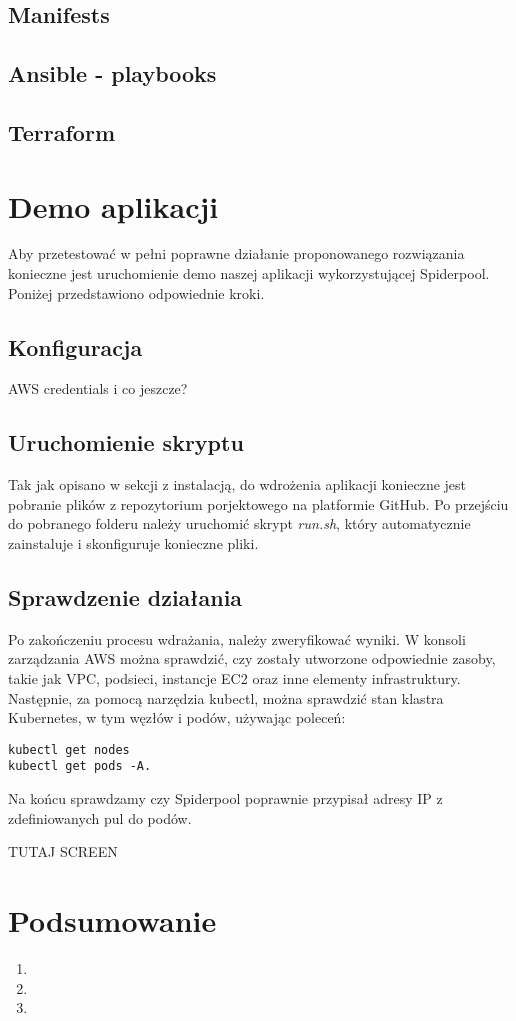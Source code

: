\documentclass[onecolumn,12pt]{article}
\begin{document}
\subsection{Manifests}

\subsection{Ansible - playbooks}

\subsection{Terraform}

\section{Demo aplikacji}
Aby przetestować w pełni poprawne działanie proponowanego rozwiązania konieczne jest uruchomienie
demo naszej aplikacji wykorzystującej Spiderpool. Poniżej przedstawiono odpowiednie kroki.

\subsection{Konfiguracja}

AWS credentials i co jeszcze?

\subsection{Uruchomienie skryptu}

Tak jak opisano w sekcji z instalacją, do wdrożenia aplikacji konieczne jest pobranie plików z 
repozytorium porjektowego na platformie GitHub. Po przejściu do pobranego folderu należy 
uruchomić skrypt \textit{run.sh}, który automatycznie zainstaluje i skonfiguruje konieczne pliki.

\subsection{Sprawdzenie działania}
Po zakończeniu procesu wdrażania, należy zweryfikować wyniki. W konsoli zarządzania AWS można
sprawdzić, czy zostały utworzone odpowiednie zasoby, takie jak VPC, podsieci, instancje EC2 oraz
inne elementy infrastruktury. Następnie, za pomocą narzędzia kubectl, można sprawdzić stan klastra
Kubernetes, w tym węzłów i podów, używając poleceń:

\begin{verbatim}
kubectl get nodes
kubectl get pods -A.
\end{verbatim}

Na końcu sprawdzamy czy Spiderpool poprawnie przypisał adresy IP z zdefiniowanych pul do podów.


TUTAJ SCREEN

\section{Podsumowanie}

\begin{enumerate}
    \item 
    \item 
    \item 
\end{enumerate}

%
\end{document}
